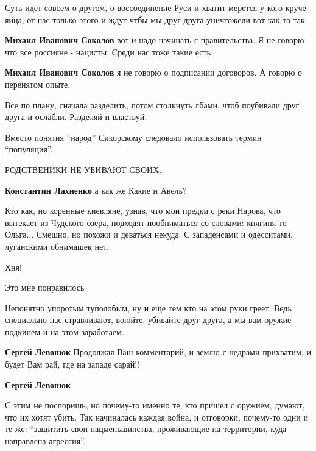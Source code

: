 \begin{itemize}
\begin{itemize}
Суть идёт совсем о другом, о воссоединение Руси и хватит мерется у кого круче
яйца, от нас только этого и ждут чтбы мы друг друга уничтожели вот как то так.

\textbf{Михаил Иванович Соколов} вот и надо начинать с правительства. Я не говорю что все россияне - нацисты. Среди нас тоже такие есть.

\textbf{Михаил Иванович Соколов} я не говорю о подписании договоров. А говорю о перенятом опыте.

\end{itemize} %

Все по плану, сначала разделить, потом столкнуть лбами, чтоб поубивали друг друга и ослабли. Разделяй и властвуй.

Вместо понятия \enquote{народ} Сикорскому следовало использовать термин \enquote{популяция}.

РОДСТВЕНИКИ НЕ УБИВАЮТ СВОИХ.

\begin{itemize} %
\textbf{Константин Лахненко} а как же Какие и Авель?
\end{itemize} %


Кто как, но коренные киевляне, узнав, что мои предки с реки Нарова, что
вытекает из Чудского озера, подходят пообниматься со словами: княгиня-то
Ольга... Смешно, но похожи и деваться некуда. С западенсами и одесситами,
луганскими обнимашек нет.

Хня!

Это мне понравилось


Непонятно упоротым туполобым, ну и еще тем кто на этом руки греет. Ведь
специально нас стравливают, воюйте, убивайте друг-друга, а мы вам оружие
подкинем и на этом заработаем.

\begin{itemize} %
\textbf{Сергей Левонюк} Продолжая Ваш комментарий, и землю с недрами прихватим, и будет Вам рай, где на западе сарай!!

\textbf{Сергей Левонюк} 

С этим не поспоришь, но почему-то именно те, кто пришел с оружием, думают, что
их хотят убить. Так начиналась каждая война, и отговорки, почему-то одни и те
же: \enquote{защитить свои нацменьшинства, проживающие на территории, куда направлена
агрессия}.


\end{itemize}
\end{itemize}
